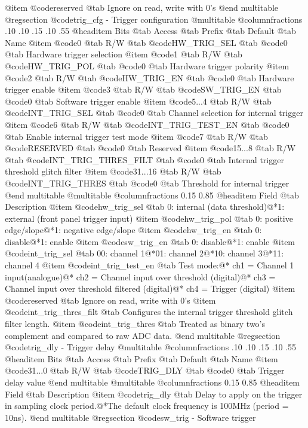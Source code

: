 @item @code{reserved} @tab Ignore on read, write with 0's
@end multitable
@regsection @code{trig_cfg} - Trigger configuration
@multitable @columnfractions .10 .10 .15 .10 .55
@headitem Bits @tab Access @tab Prefix @tab Default @tab Name
@item @code{0}
@tab R/W @tab
@code{HW_TRIG_SEL}
@tab @code{0} @tab 
Hardware trigger selection
@item @code{1}
@tab R/W @tab
@code{HW_TRIG_POL}
@tab @code{0} @tab 
Hardware trigger polarity
@item @code{2}
@tab R/W @tab
@code{HW_TRIG_EN}
@tab @code{0} @tab 
Hardware trigger enable
@item @code{3}
@tab R/W @tab
@code{SW_TRIG_EN}
@tab @code{0} @tab 
Software trigger enable
@item @code{5...4}
@tab R/W @tab
@code{INT_TRIG_SEL}
@tab @code{0} @tab 
Channel selection for internal trigger
@item @code{6}
@tab R/W @tab
@code{INT_TRIG_TEST_EN}
@tab @code{0} @tab 
Enable internal trigger test mode
@item @code{7}
@tab R/W @tab
@code{RESERVED}
@tab @code{0} @tab 
Reserved
@item @code{15...8}
@tab R/W @tab
@code{INT_TRIG_THRES_FILT}
@tab @code{0} @tab 
Internal trigger threshold glitch filter
@item @code{31...16}
@tab R/W @tab
@code{INT_TRIG_THRES}
@tab @code{0} @tab 
Threshold for internal trigger
@end multitable
@multitable @columnfractions 0.15 0.85
@headitem Field @tab Description
@item @code{hw_trig_sel} @tab 0: internal (data threshold)@*1: external (front panel trigger input)
@item @code{hw_trig_pol} @tab 0: positive edge/slope@*1: negative edge/slope
@item @code{hw_trig_en} @tab 0: disable@*1: enable
@item @code{sw_trig_en} @tab 0: disable@*1: enable
@item @code{int_trig_sel} @tab 00: channel 1@*01: channel 2@*10: channel 3@*11: channel 4
@item @code{int_trig_test_en} @tab Test mode:@* ch1 = Channel 1 input(analogue)@* ch2 = Channel input over threshold (digital)@* ch3 = Channel input over threshold filtered (digital)@* ch4 = Trigger (digital)
@item @code{reserved} @tab Ignore on read, write with 0's
@item @code{int_trig_thres_filt} @tab Configures the internal trigger threshold glitch filter length.
@item @code{int_trig_thres} @tab Treated as binary two's complement and compared to raw ADC data.
@end multitable
@regsection @code{trig_dly} - Trigger delay
@multitable @columnfractions .10 .10 .15 .10 .55
@headitem Bits @tab Access @tab Prefix @tab Default @tab Name
@item @code{31...0}
@tab R/W @tab
@code{TRIG_DLY}
@tab @code{0} @tab 
Trigger delay value
@end multitable
@multitable @columnfractions 0.15 0.85
@headitem Field @tab Description
@item @code{trig_dly} @tab Delay to apply on the trigger in sampling clock period.@*The default clock frequency is 100MHz (period = 10ns).
@end multitable
@regsection @code{sw_trig} - Software trigger
